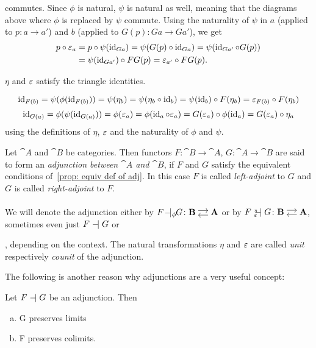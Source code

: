 \begin{bigproof}
\begin{smallproof}
\[    \]
    commutes. Since $\phi$ is natural, $\psi$ is natural as well, meaning that the diagrams above
    where $\phi$ is replaced by $\psi$ commute. Using the naturality of $\psi$ in $a$ (applied to $p \colon a \to a'$)
    and $b$ (applied to $G(p) \colon Ga \to Ga'$), we get
    \begin{align*}
        p \circ \varepsilon_a &= p \circ \psi(\operatorname{id}_{Ga}) = \psi(G(p) \circ \operatorname{id}_{Ga}) = \psi(\operatorname{id}_{Ga'} \circ G(p)) \\
        &= \psi(\operatorname{id}_{Ga'}) \circ FG(p) = \varepsilon_{a'} \circ FG(p).
    \end{align*}
\end{smallproof}
\begin{claim*} 
    $\eta$ and $\varepsilon$ satisfy the triangle identities.
\end{claim*}
\begin{smallproof}
    \[
        \operatorname{id}_{F(b)} = \psi(\phi(\operatorname{id}_{F(b)})) = \psi(\eta_b) 
        = \psi(\eta_b \circ \operatorname{id}_b) = \psi(\operatorname{id}_b) \circ F(\eta_b) = \varepsilon_{F(b)} \circ F(\eta_b)
    \]
    \[
       \operatorname{id}_{G(a)} = \phi(\psi(\operatorname{id}_{G(a)})) = \phi(\varepsilon_a) = \phi(\operatorname{id}_a \circ \varepsilon_a) 
       = G(\varepsilon_a) \circ \phi(\operatorname{id}_a) = G(\varepsilon_a) \circ \eta_a
    \]
    using the definitions of $\eta$, $\varepsilon$ and the naturality of $\phi$ and $\psi$.
\end{smallproof}
\end{bigproof}
\begin{definition}[Adjunction]
    Let $\cat{A}$ and $\cat{B}$ be categories. 
    Then functors
    $F \colon \cat{B} \to \cat{A}$, $G \colon \cat{A} \to \cat{B}$
    are said to form an \textit{adjunction between $\cat{A}$ and $\cat{B}$},
    if $F$ and $G$ satisfy the equivalent conditions of~\ref{prop: equiv def of adj}. 
    In this case $F$ is called \textit{left-adjoint} to $G$ and $G$ is called \textit{right-adjoint}
    to $F$. \\ \\
    We will denote the adjunction either by $F \! \adj_{\phi}\!\! G \colon \adjar{B}{A}$ or by 
    $F {\ }_{\eps}^{\text{\tiny{$\eta$}}}\!\!\!\!\adj G \colon \adjar{B}{A}$,
    sometimes even just $F \mathrel{-} \mathrel{\mkern-3.5mu} \mathrel{|} G$ or 
    , depending on the context. The natural transformations
    $\eta$ and $\varepsilon$ are called \textit{unit} respectively \textit{counit}
    of the adjunction.

\end{definition}
The following is another reason why adjunctions are a very useful concept:
\begin{remark}
    Let $F \mathrel{-} \mathrel{\mkern-3.5mu} \mathrel{|} G$ be an adjunction.
    Then
    \begin{enumerate}[(a)]
        \item G preserves limits
        \item F preserves colimits.
    \end{enumerate}
\end{remark}

